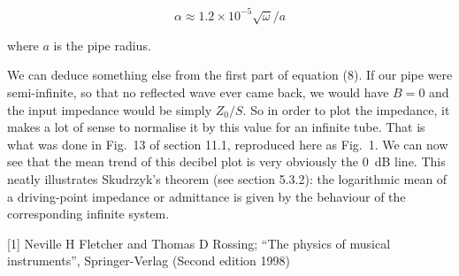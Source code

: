   $$ \alpha \approx 1.2 \times 10^{-5} \sqrt{\omega}/a \tag{10}$$ 

  where $a$ is the pipe radius. 

  We can deduce something else from the first part of equation (8). If our pipe 
  were semi-infinite, so that no reflected wave ever came back, we would have 
  $B=0$ and the input impedance would be simply $Z_0/S$. So in order to plot 
  the impedance, it makes a lot of sense to normalise it by this value for an 
  infinite tube. That is what was done in Fig.\ 13 of section 11.1, reproduced 
  here as Fig.\ 1. We can now see that the mean trend of this decibel plot is 
  very obviously the 0 dB line. This neatly illustrates Skudrzyk's theorem (see 
  section 5.3.2): the logarithmic mean of a driving-point impedance or 
  admittance is given by the behaviour of the corresponding infinite system. 

  \sectionreferences{}[1] Neville H Fletcher and Thomas D Rossing; “The physics 
  of musical instruments”, Springer-Verlag (Second edition 1998) 